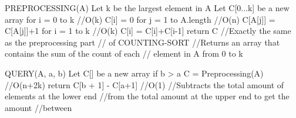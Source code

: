 PREPROCESSING(A)
	Let k be the largest element in A
	Let C[0...k] be a new array
	for i = 0 to k  			//O(k)
		C[i] = 0
	for j = 1 to A.length		//O(n)
		C[A[j]] = C[A[j]]+1
	for i = 1 to k				//O(k)
		C[i] = C[i]+C[i-1]
	return C
//Exactly the same as the preprocessing part
//	of COUNTING-SORT
//Returns an array that contains the sum of the count of each
//	element in A from 0 to k

QUERY(A, a, b)
	Let C[] be a new array
	if b > a
		C = Preprocessing(A) 	//O(n+2k)
		return C[b + 1] - C[a+1] //O(1)
//Subtracts the total amount of elements at the lower end
//from the total amount at the upper end to get the amount
//between
	
	